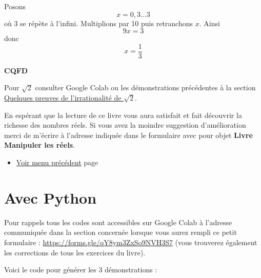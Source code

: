 \documentclass[a4paper,11pt]{book}
\begin{document}
Posons \[x = 0,3\dots 3\] où 3 se répète à l'infini. Multiplions par
10 puis retranchons \(x\).
Ainsi \[9x = 3\] donc \[x = \dfrac{1}{3}\]

\textbf{CQFD}

Pour \(\sqrt{2}\) consulter Google Colab ou les démonstrations
précédentes à la section \hyperref[orgea5a5bb]{Quelques preuves de l'irrationalité de
\(\sqrt{2}\)}. 

En espérant que la lecture de ce livre vous aura satisfait et fait
découvrir la richesse des nombres réels. Si vous avez la moindre
suggestion d'amélioration merci de m'écrire à l'adresse
indiquée dans le formulaire avec pour objet \textbf{Livre Manipuler les
réels}.

\begin{itemize}
\item \hyperref[orgfe369e8]{Voir menu précédent}
page~\pageref{page:proof1-menu}
\end{itemize}


\clearpage

\section{Avec Python}
\label{sec:org2bba363}
\label{org498288d}
\label{page:sec4.2.2python}

Pour rappels tous les codes sont accessibles sur Google Colab à
l'adresse communiquée dans la section concernée lorsque vous
aurez rempli ce petit formulaire : \url{https://forms.gle/qY8ym3ZxSo9NVH3S7}
(vous trouverez également les corrections de tous les exercices du
livre).

\clearpage

Voici le code pour générer les 3 démonstrations :
\end{document}
